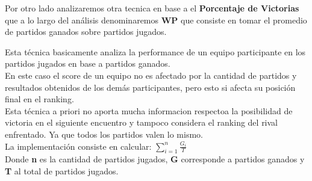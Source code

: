 Por otro lado analizaremos otra tecnica en base a el \textbf{Porcentaje de Victorias} que a lo largo del análisis denominaremos \textbf{WP} que consiste en 
tomar el promedio de partidos ganados sobre partidos jugados.

Esta técnica basicamente analiza la performance de un equipo participante en los partidos jugados en base a partidos ganados. \\

En este caso el score de un equipo no es afectado por la cantidad de partidos y resultados obtenidos de los demás participantes, pero esto si afecta su posición final en el ranking. \\

Esta técnica a priori no aporta mucha informacion respectoa la posibilidad de victoria en el siguiente encuentro y tampoco considera el ranking del rival enfrentado.
Ya que todos los partidos valen lo mismo. \\

La implementación consiste en calcular: $\sum_{i=1}^n{} \frac{G_i}{T}$ \\

Donde \textbf{n} es la cantidad de partidos jugados, \textbf{G} corresponde a partidos ganados y \textbf{T} al total de partidos jugados. \\

